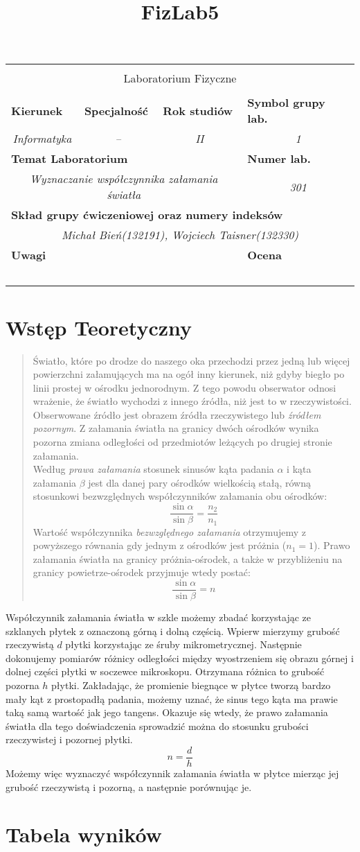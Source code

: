 \documentclass[polish,a4paper]{article}
\title{FizLab5}
\newcommand{\PRzFieldDsc}[1]{\sffamily\bfseries\scriptsize #1}
\newcommand{\PRzFieldCnt}[1]{\textit{#1}}
\newcommand{\PRzHeading}[8]{
\begin{center}
\begin{tabular}{ p{0.32\textwidth} p{0.15\textwidth} p{0.15\textwidth} p{0.12\textwidth} p{0.12\textwidth} }

  &   &   &   &   \\
\hline
\multicolumn{5}{|c|}{}\\[-1ex]
\multicolumn{5}{|c|}{{\LARGE #1}}\\
\multicolumn{5}{|c|}{}\\[-1ex]

\hline
\multicolumn{1}{|l|}{\PRzFieldDsc{Kierunek}}	& \multicolumn{1}{|l|}{\PRzFieldDsc{Specjalność}}	& \multicolumn{1}{|l|}{\PRzFieldDsc{Rok studiów}}	& \multicolumn{2}{|l|}{\PRzFieldDsc{Symbol grupy lab.}} \\
\multicolumn{1}{|c|}{\PRzFieldCnt{#2}}		& \multicolumn{1}{|c|}{\PRzFieldCnt{#3}}		& \multicolumn{1}{|c|}{\PRzFieldCnt{#4}}		& \multicolumn{2}{|c|}{\PRzFieldCnt{#5}} \\

\hline
\multicolumn{4}{|l|}{\PRzFieldDsc{Temat Laboratorium}}		& \multicolumn{1}{|l|}{\PRzFieldDsc{Numer lab.}} \\
\multicolumn{4}{|c|}{\PRzFieldCnt{#6}}				& \multicolumn{1}{|c|}{\PRzFieldCnt{#7}} \\

\hline
\multicolumn{5}{|l|}{\PRzFieldDsc{Skład grupy ćwiczeniowej oraz numery indeksów}}\\
\multicolumn{5}{|c|}{\PRzFieldCnt{#8}}\\

\hline
\multicolumn{3}{|l|}{\PRzFieldDsc{Uwagi}}	& \multicolumn{2}{|l|}{\PRzFieldDsc{Ocena}} \\
\multicolumn{3}{|c|}{\PRzFieldCnt{\ }}		& \multicolumn{2}{|c|}{\PRzFieldCnt{\ }} \\

\hline
\end{tabular}
\end{center}
}
\begin{document}
\PRzHeading{Laboratorium Fizyczne}{Informatyka}{--}{II}{1}{ Wyznaczanie współczynnika załamania światła}{301}{Michał Bień(132191), Wojciech Taisner(132330)}{}

\section{Wstęp Teoretyczny}
\begin{quotation}\cite{szuba}
Światło, które po drodze do naszego oka przechodzi przez jedną lub więcej powierzchni załamujących ma na ogół inny kierunek, niż gdyby biegło po linii prostej w ośrodku jednorodnym. Z tego powodu obserwator odnosi wrażenie, że światło wychodzi z innego źródła, niż jest to w rzeczywistości. Obserwowane źródło jest obrazem źródła rzeczywistego lub \emph{źródłem pozornym}. Z załamania światła na granicy dwóch ośrodków wynika pozorna zmiana odległości od przedmiotów leżących po drugiej stronie załamania.\\
Według \emph{prawa załamania} stosunek sinusów kąta padania $\alpha$ i kąta załamania $\beta$ jest dla danej pary ośrodków wielkością stałą, równą stosunkowi bezwzględnych współczynników załamania obu ośrodków: $$\frac{\sin\alpha}{\sin\beta} = \frac{n_2}{n_1}$$
Wartość współczynnika \emph{bezwzględnego załamania} otrzymujemy z powyższego równania gdy jednym z ośrodków jest próżnia ($n_1=1$). Prawo załamania światła na granicy próżnia-ośrodek, a także w przybliżeniu na granicy powietrze-ośrodek przyjmuje wtedy postać:
$$\frac{\sin\alpha}{\sin\beta} = n$$
\end{quotation}
Współczynnik załamania światła w szkle możemy zbadać korzystając ze szklanych płytek z oznaczoną górną i dolną częścią. Wpierw mierzymy grubość rzeczywistą $d$ płytki korzystając ze śruby mikrometrycznej. Następnie dokonujemy pomiarów różnicy odległości między wyostrzeniem się obrazu górnej i dolnej części płytki w soczewce mikroskopu. Otrzymana różnica to grubość pozorna $h$ płytki.
Zakładając, że promienie biegnące w płytce tworzą bardzo mały kąt z prostopadłą padania, możemy uznać, że sinus tego kąta ma prawie taką samą wartość jak jego tangens. Okazuje się wtedy, że prawo załamania światła dla tego doświadczenia sprowadzić można do stosunku grubości rzeczywistej i pozornej płytki. $$ n = \frac{d}{h} $$
Możemy więc wyznaczyć współczynnik załamania światła w płytce mierząc jej grubość rzeczywistą i pozorną, a następnie porównując je.

\section{Tabela wyników}
\end{document}

